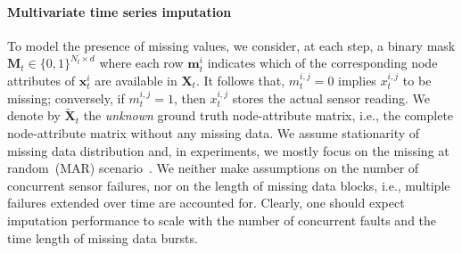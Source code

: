 \documentclass{article} \usepackage{iclr2022_conference,times}
\def\vm{{\bm{m}}}
\def\vx{{\bm{x}}}
\def\mM{{\bm{M}}}
\def\mX{{\bm{X}}}
\begin{document}
\paragraph{Multivariate time series imputation} To model the presence of missing values, we consider, at each step, a binary mask $\mM_t \in \{0, 1\}^{N_t \times d}$ where each row $\vm^i_t$ indicates which of the corresponding node attributes of $\vx^i_t$ are available in $\mX_t$. It follows that, $m^{i,j}_t=0$ implies $x^{i,j}_t$ to be missing; conversely, if $m^{i,j}_t=1$, then $x^{i,j}_t$ stores the actual sensor reading. We denote by $\widetilde \mX_t$ the \emph{unknown} ground truth node-attribute matrix, i.e., the complete node-attribute matrix without any missing data. We assume stationarity of missing data distribution and, in experiments, we mostly focus on the missing at random~(MAR) scenario~\citep{rubin1976inference}. We neither make assumptions on the number of concurrent sensor failures, nor on the length of missing data blocks, i.e., multiple failures extended over time are accounted for. Clearly, one should expect imputation performance to scale with the number of concurrent faults and the time length of missing data bursts. 
\end{document}
